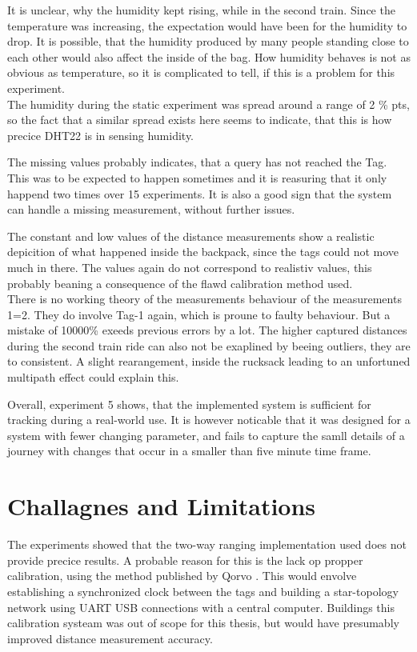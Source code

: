 It is unclear, why the humidity kept rising, while in the second train.
Since the temperature was increasing, the expectation would have been for the humidity to drop.
It is possible, that the humidity produced by many people standing close to each other would also affect the inside of the bag.
How humidity behaves is not as obvious as temperature, so it is complicated to tell, if this is a problem for this experiment.\\
The humidity during the static experiment was spread around a range of 2 \% pts, so the fact that a similar spread exists here seems to indicate, that this is how precice DHT22 is in sensing humidity.


The missing values probably indicates, that a query has not reached the Tag.
This was to be expected to happen sometimes and it is reasuring that it only happend two times over 15 experiments.
It is also a good sign that the system can handle a missing measurement, without further issues.


The constant and low values of the distance measurements show a realistic depicition of what happened inside the backpack, since the tags could not move much in there.
The values again do not correspond to realistiv values, this probably beaning a consequence of the flawd calibration method used.\\
There is no working theory of the measurements behaviour of the measurements 1=2.
They do involve Tag-1 again, which is proune to faulty behaviour.
But a mistake of 10000\% exeeds previous errors by a lot.
The higher captured distances during the second train ride can also not be exaplined by beeing outliers, they are to consistent.
A slight rearangement, inside the rucksack leading to an unfortuned multipath effect could explain this.

Overall, experiment 5 shows, that the implemented system is sufficient for tracking during a real-world use.
It is however noticable that it was designed for a system with fewer changing parameter, and fails to capture the samll details of a journey with changes that occur in a smaller than five minute time frame.

\section{Challagnes and Limitations}
\label{s:chalanges}

The experiments showed that the two-way ranging implementation used does not provide precice results.
A probable reason for this is the lack op propper calibration, using the method published by Qorvo \cite{DWM3000Calib}.
This would envolve establishing a synchronized clock between the tags and building a star-topology network using UART USB connections with a central computer.
Buildings this calibration systeam was out of scope for this thesis, but would have presumably improved distance measurement accuracy.


